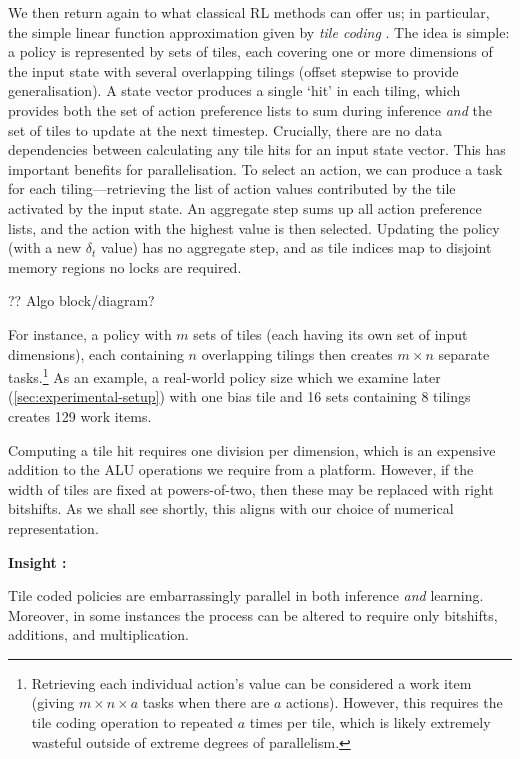 \documentclass[sigconf,natbib=false]{acmart}
\newcounter{insightc}
\newenvironment{insight}
	{
		\begin{tipblock}\refstepcounter{insightc}\textbf{Insight \theinsightc:}\em
	}
	{
		\end{tipblock}
	}
\begin{document}
We then return again to what classical RL methods can offer us; in particular, the simple linear function approximation given by \emph{tile coding} \cite[pp.\ \numrange{217}{221}]{RL2E}.
The idea is simple: a policy is represented by sets of tiles, each covering one or more dimensions of the input state with several overlapping tilings (offset stepwise to provide generalisation).
A state vector produces a single `hit' in each tiling, which provides both the set of action preference lists to sum during inference \emph{and} the set of tiles to update at the next timestep.
Crucially, there are no data dependencies between calculating any tile hits for an input state vector.
This has important benefits for parallelisation.
To select an action, we can produce a task for each tiling---retrieving the list of action values contributed by the tile activated by the input state.
An aggregate step sums up all action preference lists, and the action with the highest value is then selected.
Updating the policy (with a new $\delta_t$ value) has no aggregate step, and as tile indices map to disjoint memory regions no locks are required.

?? Algo block/diagram?

For instance, a policy with $m$ sets of tiles (each having its own set of input dimensions), each containing $n$ overlapping tilings then creates $m \times n$ separate tasks.\footnote{Retrieving each individual action's value can be considered a work item (giving $m \times n \times a$ tasks when there are $a$ actions). However, this requires the tile coding operation to repeated $a$ times per tile, which is likely extremely wasteful outside of extreme degrees of parallelism.}
As an example, a real-world policy size which we examine later (\cref{sec:experimental-setup}) with one bias tile and \num{16} sets containing \num{8} tilings creates \num{129} work items.

Computing a tile hit requires one division per dimension, which is an expensive addition to the ALU operations we require from a platform.
However, if the width of tiles are fixed at powers-of-two, then these may be replaced with right bitshifts.
As we shall see shortly, this aligns with our choice of numerical representation.

\begin{insight}
	Tile coded policies are embarrassingly parallel in both inference \emph{and} learning. Moreover, in some instances the process can be altered to require only bitshifts, additions, and multiplication.
\end{insight}
\end{document}

